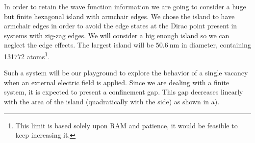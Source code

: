 In order to retain the wave function information we are going to consider a huge but finite hexagonal island with armchair edges. We chose the island to have armchair edges in order to avoid the edge states at the Dirac point present in systems with zig-zag edges.\cite{Nakada1996}
We will consider a big enough island so we can neglect the edge effects. The largest island will be $\SI{50.6}{\nm}$ in diameter, containing 131772 atoms\footnote{This limit is based solely upon RAM and patience, it would be feasible to keep increasing it.}.  %


Such a system will be our playground to explore the behavior of a single vacancy when an external electric field is applied. Since we are dealing with a finite system, it is expected to present a confinement gap.
This gap decreases linearly with the area of the island (quadratically with the side) as shown in a).
\smallskip

